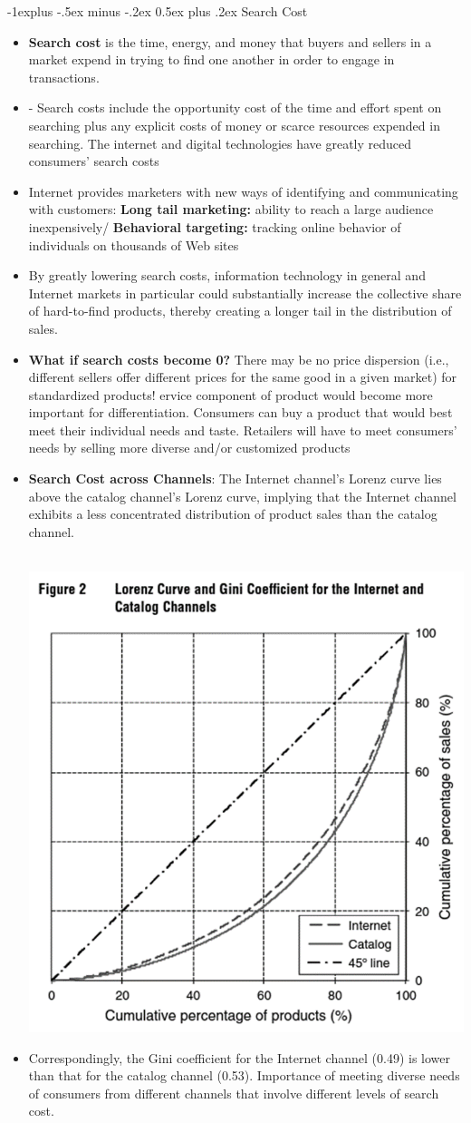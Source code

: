 \documentclass[12pt, landscape]{article}
\makeatletter
\renewcommand{\subsection}{\@startsection{subsection}{2}{0mm}%
                                {-1explus -.5ex minus -.2ex}%
                                {0.5ex plus .2ex}%
                                {\normalfont\normalsize\bfseries}}
\makeatother
\begin{document}
\begin{multicols*}{3}
\subsection{Search Cost }
\begin{itemize}
\item \textbf{Search cost} is the time, energy, and money that buyers and sellers in a market expend in trying to find one another in order to engage in transactions.
\item - Search costs include the opportunity cost of the time and effort spent on searching plus any explicit costs of money or scarce resources expended in searching. The internet and digital technologies have greatly reduced consumers’ search costs
\item Internet provides marketers with new ways of identifying and communicating with customers: \textbf{Long tail marketing:} ability to reach a large audience inexpensively/ \textbf{Behavioral targeting:} tracking online behavior of individuals on thousands of Web sites
\item By greatly lowering search costs, information technology in general and Internet markets in particular could substantially increase the collective share of hard-to-find products, thereby creating a longer tail in the distribution of sales.
\item \textbf{What if search costs become 0?} There may be no price dispersion (i.e., different sellers offer different prices for the same good in a given market) for standardized products! ervice component of product would become more important for differentiation. Consumers can buy a product that would best meet their individual needs and taste. Retailers will have to meet consumers’ needs by selling more diverse and/or customized products
\item \textbf{Search Cost across Channels}: The Internet channel’s Lorenz curve lies above the catalog channel’s Lorenz curve, implying that the Internet channel exhibits a less concentrated distribution of product sales than the catalog channel. 
~\\ ~\\
\centerline{\includegraphics[width = 0.5\linewidth]{searchGini}}
\item Correspondingly, the Gini coefficient for the Internet channel (0.49) is lower than that for the catalog channel (0.53). Importance of meeting diverse needs of consumers from different channels that involve different levels of search cost.
\end{itemize}



\end{multicols*}
\end{document}
